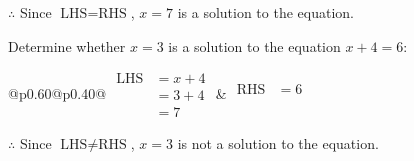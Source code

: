\documentclass[12pt]{article}
\newcounter{minipagecount}
\begin{document}
\begin{multicols}{2}
\begin{minipage}[t]{0.40\textwidth}
    \noindent \(\therefore\) Since \(\text{LHS} = \text{RHS}\), \(x = 7\) is  a solution to the equation.

\end{minipage}

 \vspace*{16pt}
\noindent{(\theminipagecount)}\hspace{0.1mm} %
\begin{minipage}[t]{0.40\textwidth} %

    \noindent Determine whether \(x = 3\) is a solution to the equation \(x + 4 = 6\):
    \vspace{4pt}  %

    \noindent
    \renewcommand{\arraystretch}{1.3} %
    \begin{tabular}{@{}p{0.60\linewidth}@{}p{0.40\linewidth}@{}}
        \(\begin{aligned}
            \text{LHS} &= x + 4 \\
                    &= 3 + 4 \\
                    &= 7 
        \end{aligned}\) &
        \(\begin{aligned}
            \text{RHS} &= 6\\
                    & \\
                    &
        \end{aligned}\)
    \end{tabular}
    \renewcommand{\arraystretch}{1.0} %
    \vspace{2pt}  %

    \noindent \(\therefore\) Since \(\text{LHS} \neq \text{RHS}\), \(x = 3\) is not  a solution to the equation.

\end{minipage}

 \vspace*{16pt}
\noindent{(\theminipagecount)}\hspace{0.1mm} %
\begin{minipage}[t]{0.40\textwidth} %


\end{minipage}
\end{multicols}
\end{document}
